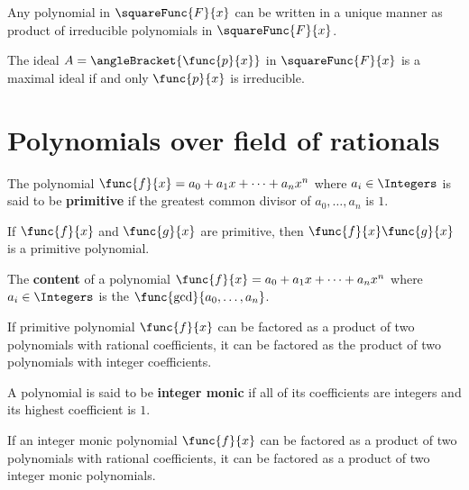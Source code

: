  \begin{lemma}
    Any polynomial in \(\squareFunc{F}{x}\) can be written in a unique manner as product of irreducible polynomials in \(\squareFunc{F}{x}\).
 \end{lemma}

 \begin{lemma}
    The ideal \(A = \angleBracket{\func{p}{x}}\) in \(\squareFunc{F}{x}\) is a maximal ideal if and only \(\func{p}{x}\) is irreducible.
 \end{lemma}

 \section{Polynomials over field of rationals}

\begin{definition}
    The polynomial \(\func{f}{x} = a_0 + a_1x + \dots + a_nx^n\) where \(a_i \in \Integers\) is said to be \textbf{primitive} if the greatest common divisor of \(a_0, \dots, a_n\) is \(1\).
\end{definition}

\begin{lemma}
    If \(\func{f}{x}\) and \(\func{g}{x}\) are primitive, then \(\func{f}{x} \func{g}{x}\) is a primitive polynomial.
\end{lemma}

\begin{definition}
    The \textbf{content} of a polynomial \(\func{f}{x} =  a_0 + a_1x + \dots + a_nx^n\) where \(a_i \in \Integers\) is the \(\func{\gcd}{a_0, \dots, a_n}\).
\end{definition}

\begin{theorem}
    If primitive polynomial \(\func{f}{x}\) can be factored as a product of two polynomials with rational coefficients, it can be factored as the product of two polynomials with integer coefficients.
\end{theorem}

\begin{definition}
    A polynomial is said to be \textbf{integer monic} if all of its coefficients are integers and its highest coefficient is \(1\).
\end{definition}

\begin{corollary}
    If an integer monic polynomial \(\func{f}{x}\) can be factored as a product of two polynomials with rational coefficients, it can be factored as a product of two integer monic polynomials.
\end{corollary}

